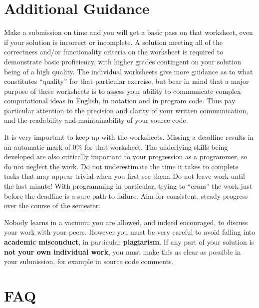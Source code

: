 \documentclass{../fal_assignment}
\begin{document}
\section*{Additional Guidance}

Make a submission on time and you will get a basic pass on that worksheet,
even if your solution is incorrect or incomplete.
A solution meeting all of the correctness and/or functionality criteria on the worksheet is required to demonstrate basic proficiency,
with higher grades contingent on your solution being of a high quality.
The individual worksheets give more guidance as to what constitutes ``quality'' for that particular exercise,
but bear in mind that a major purpose of these worksheets is to assess your ability to communicate
complex computational ideas in English, in notation and in program code.
Thus pay particular attention to the precision and clarity of your written communication,
and the readability and maintainability of your source code.

It is very important to keep up with the worksheets. Missing a deadline results in an automatic mark of 0\% for that worksheet.
The underlying skills being developed are also critically important to your progression as a programmer, so do not neglect the work.
Do not underestimate the time it takes to complete tasks that may appear trivial when you first see them.
Do not leave work until the last minute! With programming in particular, trying to ``cram'' the work just before the deadline is a sure path to failure. Aim for consistent, steady progress over the course of the semester.

Nobody learns in a vacuum: you are allowed, and indeed encouraged, to discuss your work with your peers. However you must be very careful to avoid falling into \textbf{academic misconduct}, in particular \textbf{plagiarism}. If any part of your solution is \textbf{not your own individual work}, you must make this as clear as possible in your submission, for example in source code comments.

\section*{FAQ}
\end{document}
